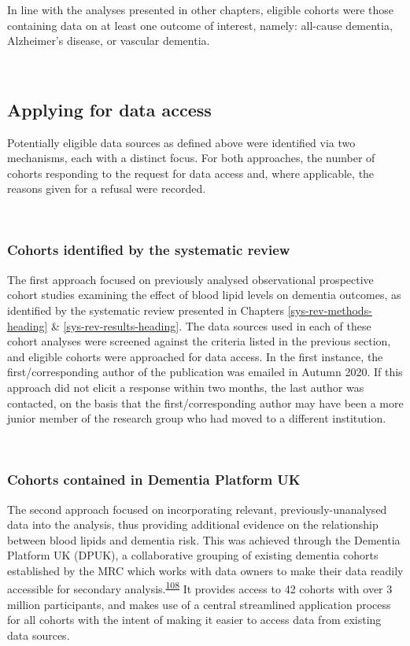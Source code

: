 \documentclass[a4paper, twoside]{templates/ociamthesis}
\begin{document}
In line with the analyses presented in other chapters, eligible cohorts were those containing data on at least one outcome of interest, namely: all-cause dementia, Alzheimer's disease, or vascular dementia.

~

\hypertarget{ipd-apply-access}{%
\subsection{Applying for data access}\label{ipd-apply-access}}

Potentially eligible data sources as defined above were identified via two mechanisms, each with a distinct focus. For both approaches, the number of cohorts responding to the request for data access and, where applicable, the reasons given for a refusal were recorded.

~

\hypertarget{cohorts-identified-by-the-systematic-review}{%
\subsubsection{Cohorts identified by the systematic review}\label{cohorts-identified-by-the-systematic-review}}

The first approach focused on previously analysed observational prospective cohort studies examining the effect of blood lipid levels on dementia outcomes, as identified by the systematic review presented in Chapters \ref{sys-rev-methods-heading} \& \ref{sys-rev-results-heading}. The data sources used in each of these cohort analyses were screened against the criteria listed in the previous section, and eligible cohorts were approached for data access. In the first instance, the first/corresponding author of the publication was emailed in Autumn 2020. If this approach did not elicit a response within two months, the last author was contacted, on the basis that the first/corresponding author may have been a more junior member of the research group who had moved to a different institution.

~

\hypertarget{cohorts-contained-in-dementia-platform-uk}{%
\subsubsection{Cohorts contained in Dementia Platform UK}\label{cohorts-contained-in-dementia-platform-uk}}

The second approach focused on incorporating relevant, previously-unanalysed data into the analysis, thus providing additional evidence on the relationship between blood lipids and dementia risk. This was achieved through the Dementia Platform UK (DPUK), a collaborative grouping of existing dementia cohorts established by the MRC which works with data owners to make their data readily accessible for secondary analysis.\textsuperscript{\protect\hyperlink{ref-bauermeister2020}{108}} It provides access to 42 cohorts with over 3 million participants, and makes use of a central streamlined application process for all cohorts with the intent of making it easier to access data from existing data sources.
\end{document}
